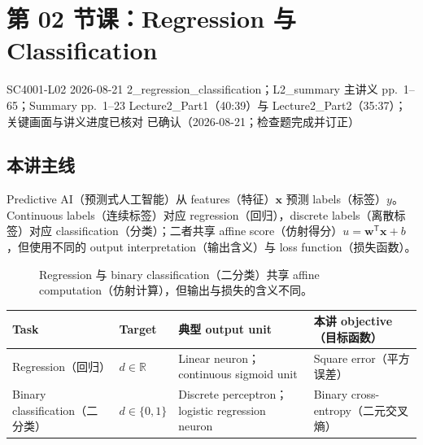 
\section{第 02 节课：Regression 与 Classification}
\label{lecture:SC4001-L02}

\lecturemeta
  {SC4001-L02}
  {2026-08-21}
  {2\_regression\_classification；L2\_summary}
  {主讲义 pp.~1--65；Summary pp.~1--23}
  {Lecture2\_Part1（40:39）与 Lecture2\_Part2（35:37）；关键画面与讲义进度已核对}
  {已确认（2026-08-21；检查题完成并订正）}

\subsection{本讲主线}

Predictive AI（预测式人工智能）从 features（特征）$\bm x$ 预测 labels（标签）$y$。Continuous labels（连续标签）对应 regression（回归），discrete labels（离散标签）对应 classification（分类）；二者共享 affine score（仿射得分）$u=\bm w^{\mathsf T}\bm x+b$，但使用不同的 output interpretation（输出含义）与 loss function（损失函数）。

\begin{figure}[htbp]
  \centering
  \resizebox{0.94\textwidth}{!}{}
  \caption{Regression 与 binary classification（二分类）共享 affine computation（仿射计算），但输出与损失的含义不同。}
  \label{fig:sc4001-l02-task-map}
\end{figure}


\begin{center}
\small
\begin{tabularx}{\textwidth}{@{}>{\raggedright\arraybackslash}p{2.5cm}>{\raggedright\arraybackslash}p{2.7cm}>{\raggedright\arraybackslash}p{3.2cm}X@{}}
  \toprule
  Task & Target & 典型 output unit & 本讲 objective（目标函数） \\
  \midrule
  Regression（回归） & $d\in\mathbb R$ & Linear neuron；continuous sigmoid unit & Square error（平方误差） \\
  Binary classification（二分类） & $d\in\{0,1\}$ & Discrete perceptron；logistic regression neuron & Binary cross-entropy（二元交叉熵） \\
  \bottomrule
\end{tabularx}
\end{center}


